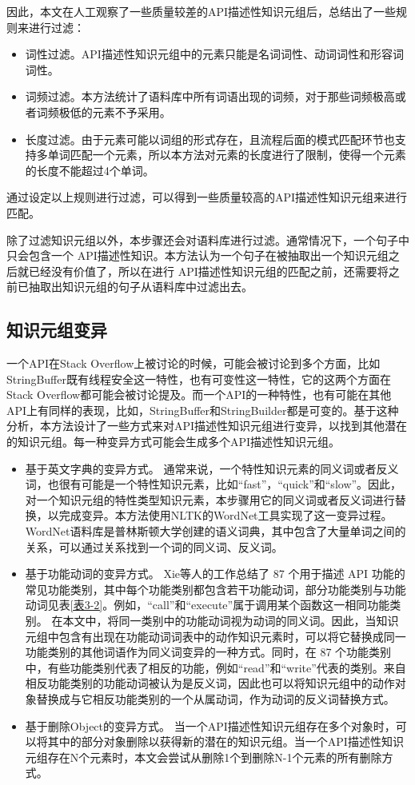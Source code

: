 因此，本文在人工观察了一些质量较差的API描述性知识元组后，总结出了一些规则来进行过滤：

\begin{itemize}
    \item 词性过滤。API描述性知识元组中的元素只能是名词词性、动词词性和形容词词性。
    \item 词频过滤。本方法统计了语料库中所有词语出现的词频，对于那些词频极高或者词频极低的元素不予采用。
    \item 长度过滤。由于元素可能以词组的形式存在，且流程后面的模式匹配环节也支持多单词匹配一个元素，所以本方法对元素的长度进行了限制，使得一个元素的长度不能超过4个单词。
\end{itemize}

通过设定以上规则进行过滤，可以得到一些质量较高的API描述性知识元组来进行匹配。

除了过滤知识元组以外，本步骤还会对语料库进行过滤。通常情况下，一个句子中只会包含一个 API描述性知识。本方法认为一个句子在被抽取出一个知识元组之后就已经没有价值了，所以在进行 API描述性知识元组的匹配之前，还需要将之前已抽取出知识元组的句子从语料库中过滤出去。

\subsection{知识元组变异}
一个API在Stack Overflow上被讨论的时候，可能会被讨论到多个方面，比如StringBuffer既有线程安全这一特性，也有可变性这一特性，它的这两个方面在Stack Overflow都可能会被讨论提及。而一个API的一种特性，也有可能在其他API上有同样的表现，比如，StringBuffer和StringBuilder都是可变的。基于这种分析，本方法设计了一些方式来对API描述性知识元组进行变异，以找到其他潜在的知识元组。每一种变异方式可能会生成多个API描述性知识元组。

\begin{itemize}
    \item 基于英文字典的变异方式。
    通常来说，一个特性知识元素的同义词或者反义词，也很有可能是一个特性知识元素，比如“fast”，“quick”和“slow”。因此，对一个知识元组的特性类型知识元素，本步骤用它的同义词或者反义词进行替换，以完成变异。本方法使用NLTK的WordNet工具实现了这一变异过程。WordNet语料库是普林斯顿大学创建的语义词典，其中包含了大量单词之间的关系，可以通过关系找到一个词的同义词、反义词。
    \item 基于功能动词的变异方式。
    Xie等人\cite{DBLP:conf/sigsoft/Xie0LTXZZ20}的工作总结了 87 个用于描述 API 功能的常见功能类别，其中每个功能类别都包含若干功能动词，部分功能类别与功能动词见表\ref{表3-2}。例如，“call”和“execute”属于调用某个函数这一相同功能类别。 在本文中，将同一类别中的功能动词视为动词的同义词。因此，当知识元组中包含有出现在功能动词词表中的动作知识元素时，可以将它替换成同一功能类别的其他词语作为同义词变异的一种方式。同时，在 87 个功能类别中，有些功能类别代表了相反的功能，例如“read”和“write”代表的类别。来自相反功能类别的功能动词被认为是反义词，因此也可以将知识元组中的动作对象替换成与它相反功能类别的一个从属动词，作为动词的反义词替换方式。
    \item 基于删除Object的变异方式。
    当一个API描述性知识元组存在多个对象时，可以将其中的部分对象删除以获得新的潜在的知识元组。当一个API描述性知识元组存在N个元素时，本文会尝试从删除1个到删除N-1个元素的所有删除方式。
\end{itemize}

